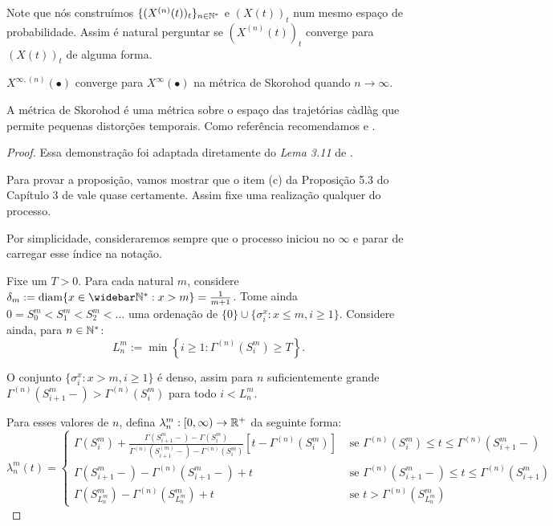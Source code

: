 Note que nós construímos $\{(X^{(n)}(t))_t\}_{n \in {\mathbb{N^*}}}$ e $(X(t))_t$
num mesmo espaço de probabilidade. Assim é natural perguntar se
$(X^{(n)}(t))_t$ converge para $(X(t))_t$ de alguma forma.

\begin{teorema}
  \label{teo:convergencia}
  $X^{\infty, (n)} (\bullet)$ converge para $X^\infty(\bullet)$ \qc na
  métrica de Skorohod quando $n \to \infty$.
\end{teorema}

A métrica de Skorohod é uma métrica sobre o espaço das trajetórias
càdlàg que permite pequenas distorções temporais. Como
referência recomendamos \cite{billingsley:99} e \cite{ethier:86}.

\begin{proof}
  Essa demonstração foi adaptada diretamente do \emph{Lema 3.11} de
  \cite{fontes:08}.

  Para provar a proposição, vamos mostrar que o item (c) da Proposição
  5.3 do Capítulo 3 de \cite{ethier:86} vale quase certamente. Assim
  fixe uma realização qualquer do processo.

  Por simplicidade, consideraremos sempre que o processo iniciou no
  $\infty$ e parar de carregar esse índice na notação.

  Fixe um $T > 0$. Para cada natural $m$, considere $\delta_m :=
  \diam\{ x \in \Nzb: x > m \} = \frac{1}{m+1}$. Tome ainda $0 = S_0^m
  < S_1^m < S_2^m < \ldots $ uma ordenação de $\{0\}\cup\{ \sigma^x_i
  : x \leq m, i \geq 1\}$. Considere ainda, para $n \in {\mathbb{N^*}}$:
  \begin{displaymath}
    L^m_n := \min \left\{ i \geq 1: \Gamma^{(n)}(S^m_i) \geq T \right\}.
  \end{displaymath}

  O conjunto $\{\sigma_i^x: x > m, i\geq 1\}$ é denso, assim para $n$
  suficientemente grande $\Gamma^{(n)}(S^m_{i+1}-) >
  \Gamma^{(n)}(S^m_i)$ para todo $i < L^m_n$.

  Para esses valores de $n$, defina $\lambda_n^m: [0, \infty) \to {\mathbb{R}}^+$
  da seguinte forma:
  \begin{displaymath}
    \lambda_n^m(t) = \begin{cases}
      \Gamma(S_i^m) + \frac{\Gamma(S_{i+1}^m-) - \Gamma(S_i^m)}
      {\Gamma^{(n)}(S_{i+1}^{(m)} -) - \Gamma^{(n)}(S_i^m)}
      \left[t - \Gamma^{(n)}(S_i^m)\right]
      & \textrm{ se }
      \Gamma^{(n)}(S_i^m) \leq t \leq \Gamma^{(n)}(S_{i+1}^m-) \\
      \Gamma(S_{i+1}^m-) - \Gamma^{(n)}(S_{i+1}^m-) + t
      & \textrm{ se }
      \Gamma^{(n)}(S_{i+1}^m-) \leq t \leq \Gamma^{(n)}(S_{i+1}^m)\\
      \Gamma(S^m_{L_n^m}) - \Gamma^{(n)}(S^m_{L_n^m}) + t
      & \textrm{ se } t > \Gamma^{(n)}(S^m_{L_n^m})
    \end{cases}
  \end{displaymath}


\end{proof}
